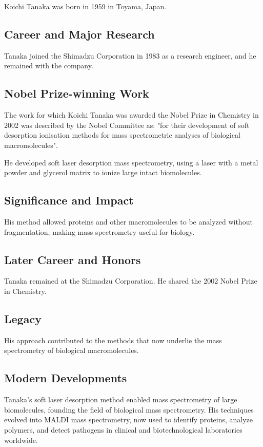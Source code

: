 Koichi Tanaka was born in 1959 in Toyama, Japan.

\subsection*{Career and Major Research}

Tanaka joined the Shimadzu Corporation in 1983 as a research engineer, and he remained with the company.

\subsection*{Nobel Prize-winning Work}

The work for which Koichi Tanaka was awarded the Nobel Prize in Chemistry in 2002 was described by the Nobel Committee as: "for their development of soft desorption ionisation methods for mass spectrometric analyses of biological macromolecules".

He developed soft laser desorption mass spectrometry, using a laser with a metal powder and glycerol matrix to ionize large intact biomolecules.

\subsection*{Significance and Impact}

His method allowed proteins and other macromolecules to be analyzed without fragmentation, making mass spectrometry useful for biology.

\subsection*{Later Career and Honors}

Tanaka remained at the Shimadzu Corporation. He shared the 2002 Nobel Prize in Chemistry.

\subsection*{Legacy}

His approach contributed to the methods that now underlie the mass spectrometry of biological macromolecules.

\subsection*{Modern Developments}

Tanaka's soft laser desorption method enabled mass spectrometry of large biomolecules, founding the field of biological mass spectrometry. His techniques evolved into MALDI mass spectrometry, now used to identify proteins, analyze polymers, and detect pathogens in clinical and biotechnological laboratories worldwide.

